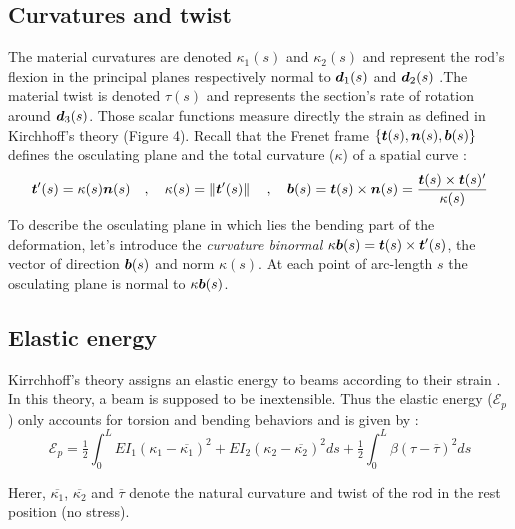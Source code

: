 \subsection{Curvatures and twist}
The material curvatures are denoted $\kappa_1(s)$ and $\kappa_2(s)$ and represent the rod’s flexion in the principal planes respectively normal to $\boldsymbol{d}_1(s)$ and $\boldsymbol{d}_2(s)$ .The material twist is denoted $\tau(s)$ and represents the section’s rate of rotation around $\boldsymbol{d}_3(s)$. Those scalar functions measure directly the strain as defined in Kirchhoff’s theory (Figure 4). Recall that the Frenet frame $\{\boldsymbol{t}(s),\boldsymbol{n}(s),\boldsymbol{b}(s)\}$ defines the osculating plane and the total curvature ($\kappa$) of a spatial curve :
\begin{equation}
	\boldsymbol{t}'(s) = \kappa(s) \boldsymbol{n}(s)
	\quad,\quad
	\kappa(s) = \left\|\boldsymbol{t}'(s)\right\|
	\quad,\quad
	\boldsymbol{b}(s) = \boldsymbol{t}(s) \times \boldsymbol{n}(s) = \frac{\boldsymbol{t}(s) \times \boldsymbol{t}(s)'}{\kappa(s)} 
\end{equation}
To describe the osculating plane in which lies the bending part of the deformation, let’s introduce the \emph{curvature binormal} $\kappa\boldsymbol{b}(s) = \boldsymbol{t}(s)\times\boldsymbol{t}'(s)$, the vector of direction $\boldsymbol{b}(s)$ and norm $\kappa(s)$. At each point of arc-length $s$ the osculating plane is normal to $\kappa\boldsymbol{b}(s)$.

\subsection{Elastic energy}
Kirrchhoff’s theory assigns an elastic energy to beams according to their strain \cite{Audoly2010}. In this theory, a beam is supposed to be inextensible. Thus the elastic energy ($\mathcal{E}_p$) only accounts for torsion and bending behaviors and is given by :
\begin{equation}
	\mathcal{E}_{p} = 
	\tfrac{1}{2} \int_{0}^{L}EI_1(\kappa_1-\overbar{\kappa_1})^2 + EI_2(\kappa_2-\overbar{\kappa_2})^2 ds
	+ \tfrac{1}{2} \int_{0}^{L} \beta(\tau -{\overbar{\tau}})^2 ds
\end{equation}

Herer, $\overbar{\kappa_1}$, $\overbar{\kappa_2}$ and $\overbar{\tau}$  denote the natural curvature and twist of the rod in the rest position (no stress).

